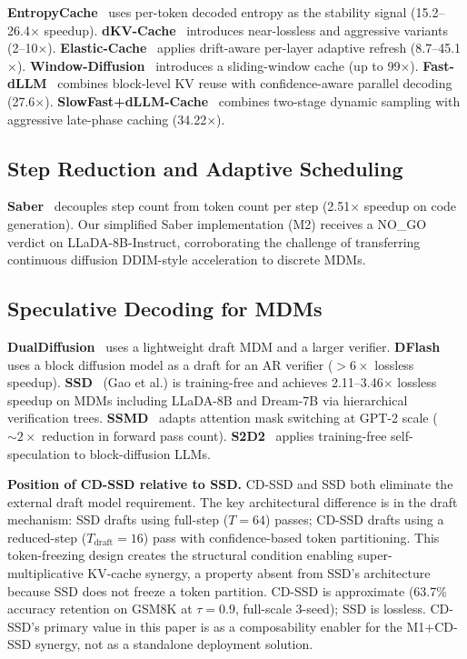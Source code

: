 \documentclass{article}
\newcommand{\Tdraft}{T_{\text{draft}}}
\begin{document}
\textbf{EntropyCache}~\cite{entropycache} uses per-token decoded entropy as the stability signal
(15.2--26.4$\times$ speedup). \textbf{dKV-Cache}~\cite{dkvcache} introduces near-lossless and
aggressive variants (2--10$\times$). \textbf{Elastic-Cache}~\cite{elasticcache} applies drift-aware
per-layer adaptive refresh (8.7--45.1$\times$). \textbf{Window-Diffusion}~\cite{windowdiffusion}
introduces a sliding-window cache (up to 99$\times$). \textbf{Fast-dLLM}~\cite{fastdllm} combines
block-level KV reuse with confidence-aware parallel decoding (27.6$\times$).
\textbf{SlowFast+dLLM-Cache}~\cite{slowfast} combines two-stage dynamic sampling with aggressive
late-phase caching (34.22$\times$).

\subsection{Step Reduction and Adaptive Scheduling}

\textbf{Saber}~\cite{saber} decouples step count from token count per step (2.51$\times$ speedup on
code generation). Our simplified Saber implementation (M2) receives a NO\_GO verdict on
LLaDA-8B-Instruct, corroborating the challenge of transferring continuous diffusion DDIM-style
acceleration to discrete MDMs.

\subsection{Speculative Decoding for MDMs}

\textbf{DualDiffusion}~\cite{dualdiffusion} uses a lightweight draft MDM and a larger verifier.
\textbf{DFlash}~\cite{dflash} uses a block diffusion model as a draft for an AR verifier
($> 6\times$ lossless speedup). \textbf{SSD}~\cite{ssd} (Gao et al.) is training-free and achieves
2.11--3.46$\times$ lossless speedup on MDMs including LLaDA-8B and Dream-7B via hierarchical
verification trees. \textbf{SSMD}~\cite{ssmd} adapts attention mask switching at GPT-2 scale
(${\sim}2\times$ reduction in forward pass count). \textbf{S2D2}~\cite{s2d2} applies training-free
self-speculation to block-diffusion LLMs.

\textbf{Position of CD-SSD relative to SSD.} CD-SSD and SSD both eliminate the external draft model
requirement. The key architectural difference is in the draft mechanism: SSD drafts using full-step
($T = 64$) passes; CD-SSD drafts using a reduced-step ($\Tdraft = 16$) pass with confidence-based
token partitioning. This token-freezing design creates the structural condition enabling
super-multiplicative KV-cache synergy, a property absent from SSD's architecture because SSD does
not freeze a token partition. CD-SSD is approximate (63.7\% accuracy retention on GSM8K at
$\tau=0.9$, full-scale 3-seed); SSD is lossless. CD-SSD's primary value in this paper is as a
composability enabler for the M1+CD-SSD synergy, not as a standalone deployment solution.
\end{document}
